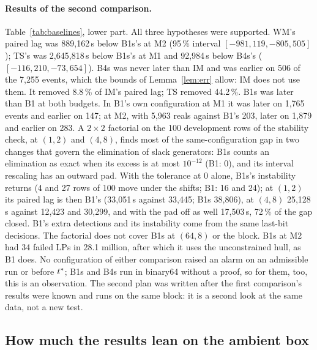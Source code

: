 \paragraph{Results of the second comparison.} Table~\ref{tab:baselines}, lower part. All three hypotheses were
supported. WM's paired lag was 889,162\,s below B1s's at M2 (95\,\% interval $[-981{,}119, -805{,}505]$); TS's was
2,645,818\,s below B1s's at M1 and 92,984\,s below B4s's ($[-116{,}210, -73{,}654]$). B4s was never later than IM and
was earlier on 506 of the 7,255 events, which the bounds of Lemma~\ref{lem:err} allow: IM does not use them. It
removed 8.8\,\% of IM's paired lag; TS removed 44.2\,\%. B1s was later than B1 at both budgets. In B1's own
configuration at M1 it was later on 1,765 events and earlier on 147; at M2, with 5,963 reals against B1's 203, later on
1,879 and earlier on 283. A $2\times2$ factorial on the 100 development rows of the stability check, at $(1,2)$ and
$(4,8)$, finds most of the same-configuration gap in two changes that govern the elimination of slack generators:
B1s counts an elimination as exact when its excess is at most $10^{-12}$ (B1: 0), and its interval rescaling has an
outward pad. With the tolerance at 0 alone, B1s's instability returns (4 and 27 rows of 100 move under the shifts;
B1: 16 and 24); at $(1,2)$ its paired lag is then B1's (33,051\,s against 33,445; B1s 38,806), at $(4,8)$ 25,128\,s
against 12,423 and 30,299, and with the pad off as well 17,503\,s, 72\,\% of the gap closed. B1's extra detections
and its instability come from the same last-bit decisions. The factorial does not cover B1s at $(64,8)$ or the
block. B1s at M2 had 34 failed LPs
in 28.1 million, after which it uses the unconstrained hull, as B1 does. No configuration of either comparison raised
an alarm on an admissible run or before $t^{\ast}$; B1s and B4s run in binary64 without a proof, so for them, too, this
is an observation. The second plan was written after the first comparison's results were known and runs on the same
block: it is a second look at the same data, not a new test.

\subsection{How much the results lean on the ambient box}\label{sec:ambient}

